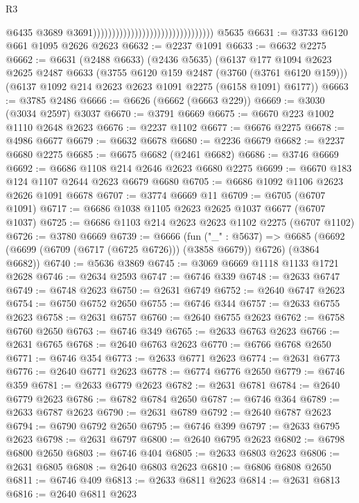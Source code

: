 \begin{lexlean}{R3}
\begin{coremodule}
                                                                    @6435
                                                                    @3689
                                                                    @3691))))))))))))))))))))))))))))))))
    @5635
@6631 := @3733 @6120 @661 @1095 @2626 @2623
@6632 := @2237 @1091
@6633 := @6632 @2275
@6662 := @6631
    (@2488 @6633)
    (@2436 @5635)
    (@6137
      @177
      @1094
      @2623
      @2625
      @2487
      @6633
      (@3755 @6120 @159 @2487 (@3760 (@3761 @6120 @159)))
      (@6137 @1092 @214 @2623 @2623 @1091 @2275 (@6158 @1091) @6177))
@6663 := @3785 @2486
@6666 := @6626 (@6662 (@6663 @229))
@6669 := @3030 (@3034 @2597) @3037
@6670 := @3791 @6669
@6675 := @6670 @223 @1002 @1110 @2648 @2623
@6676 := @2237 @1102
@6677 := @6676 @2275
@6678 := @4986 @6677
@6679 := @6632 @6678
@6680 := @2236 @6679
@6682 := @2237 @6680 @2275
@6685 := @6675 @6682 (@2461 @6682)
@6686 := @3746 @6669
@6692 := @6686 @1108 @214 @2646 @2623 @6680 @2275
@6699 := @6670 @183 @124 @1107 @2644 @2623 @6679 @6680
@6705 := @6686 @1092 @1106 @2623 @2626 @1091 @6678
@6707 := @3774 @6669 @11
@6709 := @6705 (@6707 @1091)
@6717 := @6686 @1038 @1105 @2623 @2625 @1037 @6677 (@6707 @1037)
@6725 := @6686 @1103 @214 @2623 @2623 @1102 @2275 (@6707 @1102)
@6726 := @3780 @6669
@6739 := @6666
    (fun ("_" : @5637) =>
    @6685 (@6692 (@6699 (@6709 (@6717 (@6725 @6726))) (@3858 @6679)) @6726) (@3864 @6682))
@6740 := @5636 @3869
@6745 := @3069 @6669 @1118 @1133 @1721 @2628
@6746 := @2634 @2593
@6747 := @6746 @339
@6748 := @2633 @6747
@6749 := @6748 @2623
@6750 := @2631 @6749
@6752 := @2640 @6747 @2623
@6754 := @6750 @6752 @2650
@6755 := @6746 @344
@6757 := @2633 @6755 @2623
@6758 := @2631 @6757
@6760 := @2640 @6755 @2623
@6762 := @6758 @6760 @2650
@6763 := @6746 @349
@6765 := @2633 @6763 @2623
@6766 := @2631 @6765
@6768 := @2640 @6763 @2623
@6770 := @6766 @6768 @2650
@6771 := @6746 @354
@6773 := @2633 @6771 @2623
@6774 := @2631 @6773
@6776 := @2640 @6771 @2623
@6778 := @6774 @6776 @2650
@6779 := @6746 @359
@6781 := @2633 @6779 @2623
@6782 := @2631 @6781
@6784 := @2640 @6779 @2623
@6786 := @6782 @6784 @2650
@6787 := @6746 @364
@6789 := @2633 @6787 @2623
@6790 := @2631 @6789
@6792 := @2640 @6787 @2623
@6794 := @6790 @6792 @2650
@6795 := @6746 @399
@6797 := @2633 @6795 @2623
@6798 := @2631 @6797
@6800 := @2640 @6795 @2623
@6802 := @6798 @6800 @2650
@6803 := @6746 @404
@6805 := @2633 @6803 @2623
@6806 := @2631 @6805
@6808 := @2640 @6803 @2623
@6810 := @6806 @6808 @2650
@6811 := @6746 @409
@6813 := @2633 @6811 @2623
@6814 := @2631 @6813
@6816 := @2640 @6811 @2623

\end{coremodule}
\end{lexlean}
